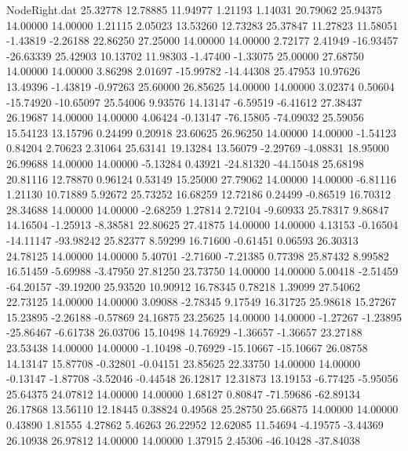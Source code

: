 \begin{filecontents}{NodeRight.dat}
  25.32778   12.78885   11.94977     1.21193    1.14031   20.79062   25.94375   14.00000   14.00000    1.21115    2.05023   13.53260   12.73283
  25.37847   11.27823   11.58051    -1.43819   -2.26188   22.86250   27.25000   14.00000   14.00000    2.72177    2.41949  -16.93457  -26.63339
  25.42903   10.13702   11.98303    -1.47400   -1.33075   25.00000   27.68750   14.00000   14.00000    3.86298    2.01697  -15.99782  -14.44308
  25.47953   10.97626   13.49396    -1.43819   -0.97263   25.60000   26.85625   14.00000   14.00000    3.02374    0.50604  -15.74920  -10.65097
  25.54006    9.93576   14.13147    -6.59519   -6.41612   27.38437   26.19687   14.00000   14.00000    4.06424   -0.13147  -76.15805  -74.09032
  25.59056   15.54123   13.15796     0.24499    0.20918   23.60625   26.96250   14.00000   14.00000   -1.54123    0.84204    2.70623    2.31064
  25.63141   19.13284   13.56079    -2.29769   -4.08831   18.95000   26.99688   14.00000   14.00000   -5.13284    0.43921  -24.81320  -44.15048
  25.68198   20.81116   12.78870     0.96124    0.53149   15.25000   27.79062   14.00000   14.00000   -6.81116    1.21130   10.71889    5.92672
  25.73252   16.68259   12.72186     0.24499   -0.86519   16.70312   28.34688   14.00000   14.00000   -2.68259    1.27814    2.72104   -9.60933
  25.78317    9.86847   14.16504    -1.25913   -8.38581   22.80625   27.41875   14.00000   14.00000    4.13153   -0.16504  -14.11147  -93.98242
  25.82377    8.59299   16.71600    -0.61451    0.06593   26.30313   24.78125   14.00000   14.00000    5.40701   -2.71600   -7.21385    0.77398
  25.87432    8.99582   16.51459    -5.69988   -3.47950   27.81250   23.73750   14.00000   14.00000    5.00418   -2.51459  -64.20157  -39.19200
  25.93520   10.90912   16.78345     0.78218    1.39099   27.54062   22.73125   14.00000   14.00000    3.09088   -2.78345    9.17549   16.31725
  25.98618   15.27267   15.23895    -2.26188   -0.57869   24.16875   23.25625   14.00000   14.00000   -1.27267   -1.23895  -25.86467   -6.61738
  26.03706   15.10498   14.76929    -1.36657   -1.36657   23.27188   23.53438   14.00000   14.00000   -1.10498   -0.76929  -15.10667  -15.10667
  26.08758   14.13147   15.87708    -0.32801   -0.04151   23.85625   22.33750   14.00000   14.00000   -0.13147   -1.87708   -3.52046   -0.44548
  26.12817   12.31873   13.19153    -6.77425   -5.95056   25.64375   24.07812   14.00000   14.00000    1.68127    0.80847  -71.59686  -62.89134
  26.17868   13.56110   12.18445     0.38824    0.49568   25.28750   25.66875   14.00000   14.00000    0.43890    1.81555    4.27862    5.46263
  26.22952   12.62085   11.54694    -4.19575   -3.44369   26.10938   26.97812   14.00000   14.00000    1.37915    2.45306  -46.10428  -37.84038

\end{filecontents}
